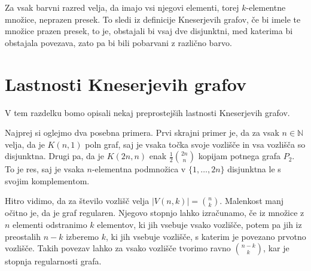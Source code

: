 \documentclass[a4paper,12pt]{article}
\begin{document}
Za vsak barvni razred velja, da imajo vsi njegovi elementi, torej $k$-elementne množice, neprazen presek. To sledi iz definicije Kneserjevih grafov, če bi imele te množice prazen presek, to je, obstajali bi vsaj dve disjunktni, med katerima bi obstajala povezava, zato pa bi bili pobarvani z različno barvo.



\newpage
\section{Lastnosti Kneserjevih grafov}

V tem razdelku bomo opisali nekaj preprostejših lastnosti Kneserjevih grafov.

Najprej si oglejmo dva posebna primera. Prvi skrajni primer je, da za vsak $n \in \mathbb{N}$ velja, da je $K(n,1)$ poln graf, saj je vsaka točka svoje vozlišče in vsa vozlišča so disjunktna. Drugi pa, da je $K(2n,n)$ enak $\frac{1}{2} {{2n}\choose{n}}$ kopijam potnega grafa $P_2$. To je res, saj je vsaka $n$-elementna podmnožica v $\{1,\ldots,2n\}$ disjunktna le s svojim komplementom.

Hitro vidimo, da za število vozlišč velja $|V(n,k)|={{n}\choose{k}}$. Malenkost manj očitno je, da je graf regularen. Njegovo stopnjo lahko izračunamo, če iz množice z $n$ elementi odstranimo $k$ elementov, ki jih vsebuje vsako vozlišče, potem pa jih iz preostalih $n-k$ izberemo $k$, ki jih vsebuje vozlišče, s katerim je povezano prvotno vozlišče. Takih povezav lahko za vsako vozlišče tvorimo ravno ${n-k}\choose{k}$, kar je stopnja regularnosti grafa.
\end{document}
